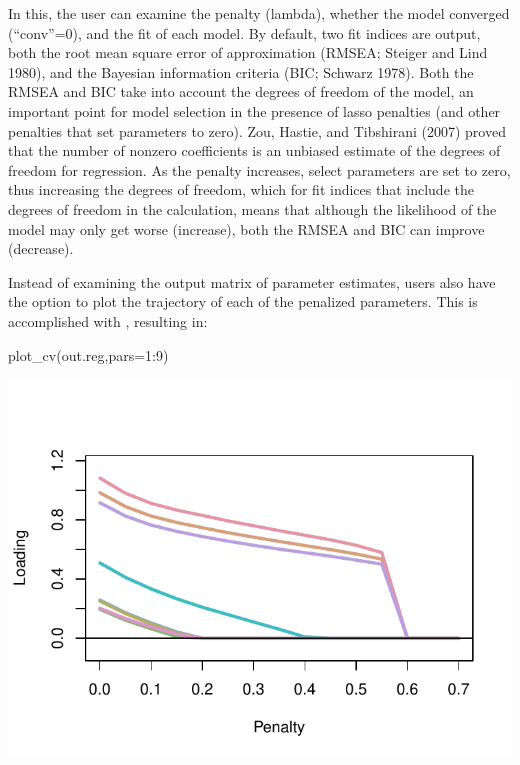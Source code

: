 \documentclass[article]{jss}
\begin{document}
In this, the user can examine the penalty (lambda), whether the model
converged (``conv''=0), and the fit of each model. By default, two fit
indices are output, both the root mean square error of approximation
(RMSEA; Steiger and Lind 1980), and the Bayesian information criteria
(BIC; Schwarz 1978). Both the RMSEA and BIC take into account the
degrees of freedom of the model, an important point for model selection
in the presence of lasso penalties (and other penalties that set
parameters to zero). Zou, Hastie, and Tibshirani (2007) proved that the
number of nonzero coefficients is an unbiased estimate of the degrees of
freedom for regression. As the penalty increases, select parameters are
set to zero, thus increasing the degrees of freedom, which for fit
indices that include the degrees of freedom in the calculation, means
that although the likelihood of the model may only get worse (increase),
both the RMSEA and BIC can improve (decrease).

Instead of examining the  output matrix of parameter
estimates, users also have the option to plot the trajectory of each of
the penalized parameters. This is accomplished with
, resulting in:

\begin{CodeChunk}
\begin{CodeInput}
plot_cv(out.reg,pars=1:9)
\end{CodeInput}


\begin{center}\includegraphics{draft1_files/figure-latex/unnamed-chunk-6-1} \end{center}

\end{CodeChunk}
\end{document}
